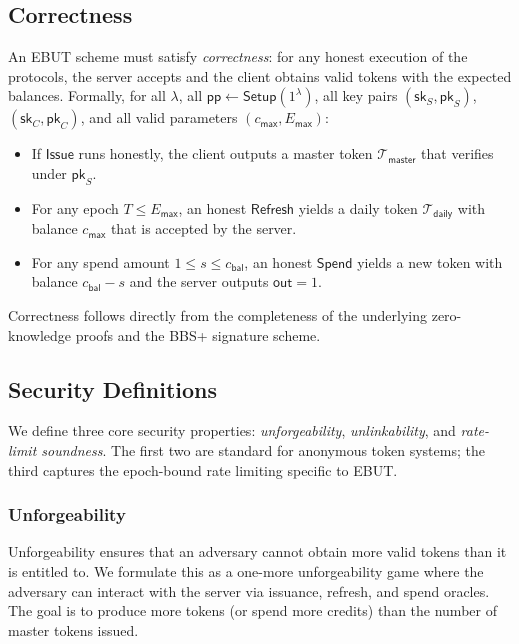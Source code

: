 \documentclass[11pt]{article}
\theoremstyle{definitionstyle}
\theoremstyle{plain}
\begin{document}
\subsection{Correctness}
An EBUT scheme must satisfy \emph{correctness}: for any honest execution of the protocols, the server accepts and the client obtains valid tokens with the expected balances. Formally, for all $\lambda$, all $\mathsf{pp} \leftarrow \mathsf{Setup}(1^\lambda)$, all key pairs $(\mathsf{sk}_S, \mathsf{pk}_S)$, $(\mathsf{sk}_C, \mathsf{pk}_C)$, and all valid parameters $(c_{\mathsf{max}}, E_{\mathsf{max}})$:
\begin{itemize}
\item If $\mathsf{Issue}$ runs honestly, the client outputs a master token $\mathcal{T}_{\mathsf{master}}$ that verifies under $\mathsf{pk}_S$.
\item For any epoch $T \le E_{\mathsf{max}}$, an honest $\mathsf{Refresh}$ yields a daily token $\mathcal{T}_{\mathsf{daily}}$ with balance $c_{\mathsf{max}}$ that is accepted by the server.
\item For any spend amount $1 \le s \le c_{\mathsf{bal}}$, an honest $\mathsf{Spend}$ yields a new token with balance $c_{\mathsf{bal}}-s$ and the server outputs $\mathsf{out}=1$.
\end{itemize}
Correctness follows directly from the completeness of the underlying zero-knowledge proofs and the BBS+ signature scheme.

\subsection{Security Definitions}
We define three core security properties: \emph{unforgeability}, \emph{unlinkability}, and \emph{rate-limit soundness}. The first two are standard for anonymous token systems; the third captures the epoch-bound rate limiting specific to EBUT.

\subsubsection{Unforgeability}
Unforgeability ensures that an adversary cannot obtain more valid tokens than it is entitled to. We formulate this as a one-more unforgeability game where the adversary can interact with the server via issuance, refresh, and spend oracles. The goal is to produce more tokens (or spend more credits) than the number of master tokens issued.
\end{document}
